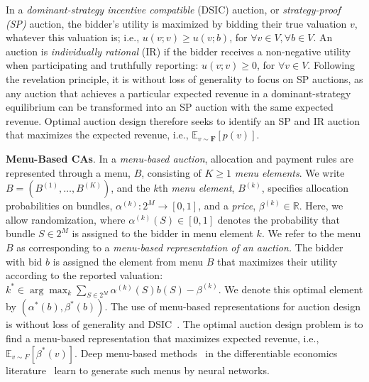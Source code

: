 In a \emph{dominant-strategy incentive compatible} (DSIC) auction, or {\em strategy-proof (SP)} auction, the bidder's utility is  maximized by bidding their true valuation $v$, whatever this valuation is; i.e., $u(v; v)\ge u(v;b)$, for $\forall v\in V, \forall b\in V$.
An auction is \emph{individually rational} (IR) if the bidder receives a non-negative utility when participating and truthfully reporting: $u(v;v)\ge 0$, for $\forall v\in V$.
Following the revelation principle, it is without loss of generality to focus on  
SP
auctions, as any auction that achieves a particular expected revenue in a dominant-strategy equilibrium
 can be transformed into an SP auction with the same expected revenue.
 Optimal auction design therefore seeks to identify an SP and IR auction that maximizes the expected revenue, i.e., $\mathbb{E}_{v\sim \bm F}[p(v)]$. 

\textbf{Menu-Based CAs}. In a {\em menu-based auction}, allocation and payment rules  are
represented through a menu, $B$, consisting of
$K\ge 1$  {\em menu elements}.
%
We write $B=(B^{(1)},\ldots,B^{(K)})$, 
and the $k$th \emph{menu element}, $B^{(k)}$,
 specifies allocation probabilities on bundles,
 $\alpha^{(k)}: 2^M\rightarrow [0,1]$, and a {\em price}, $\beta^{(k)}\in \mathbb{R}$.
%
Here, we allow randomization, where  $\alpha^{(k)}(S)\in[0,1]$ denotes the
  probability that bundle $S\in 2^M$ is assigned to the bidder in menu element $k$. 
We refer to the menu $B$ as corresponding to a {\em menu-based representation 
of an auction.} The bidder with bid $b$ is assigned the element from menu $B$ that maximizes their utility according to the reported valuation: $k^*\in \arg\max_k \sum_{S\in 2^M}\alpha^{(k)}(S)b(S)-\beta^{(k)}$. We denote this optimal element by $(\alpha^*(b), \beta^*(b))$. 
The use of menu-based representations for auction design 
is without loss of generality and DSIC~\cite{hammond1979straightforward}.
%
The optimal auction design problem is to find a menu-based representation that 
maximizes  expected revenue, i.e., $\mathbb{E}_{v\sim F}[ \beta^{*}(v)]$. Deep menu-based methods~\cite{dutting2024optimal,shen2019automated} in the differentiable economics literature~\cite{zheng2022ai,finocchiaro2021bridging,wang2023deep,ivanov2024principal,zhang2024position,hossain2024multi,rahme2020auction,ivanov2022optimal,curry2022differentiable,duan2023scalable} learn to generate such menus by neural networks.

